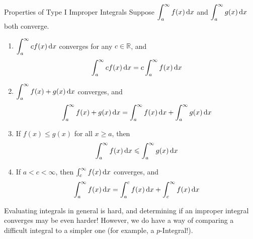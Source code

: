 \begin{Theorem}{Properties of Type I Improper Integrals}{}
    Suppose $ \displaystyle \int_{a}^{\infty} f(x)\odif{x}  $ and
    $ \displaystyle \int_{a}^{\infty} g(x)\odif{x}  $
    both converge.
    \begin{enumerate}[label=(\arabic*)]
        \item $ \displaystyle \int_{a}^{\infty} cf(x)\odif{x} $
              converges for any $ c\in\mathbb{R} $, and
              \[ \int_{a}^{\infty} cf(x)\odif{x} =c \int_{a}^{\infty} f(x)\odif{x} \]
        \item $ \displaystyle \int_{a}^{\infty} f(x)+g(x)\odif{x} $
              converges, and
              \[ \int_{a}^{\infty} f(x)+g(x)\odif{x}=
                  \int_{a}^{\infty} f(x)\odif{x} +\int_{a}^{\infty} g(x)\odif{x} \]
        \item If $ f(x)\leqslant g(x) $ for all $ x\geqslant a $, then
              \[ \int_{a}^{\infty} f(x)\odif{x} \leqslant \int_{a}^{\infty} g(x)\odif{x} \]
        \item If $ a<c<\infty $, then $ \int_{c}^{\infty} f(x)\odif{x} $ converges, and
              \[ \int_{a}^{\infty} f(x)\odif{x}=
                  \int_{a}^{c} f(x)\odif{x} +\int_{c}^{\infty} f(x)\odif{x} \]
    \end{enumerate}
\end{Theorem}
Evaluating integrals in general is hard, and determining if an improper integral converges
may be even harder! However, we do have a way of comparing a difficult
integral to a simpler one (for example, a $ p $-Integral!).

